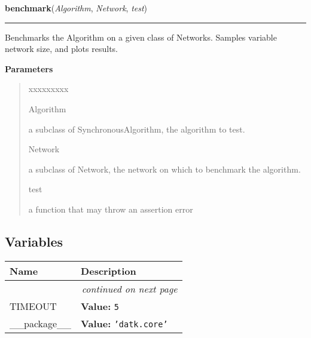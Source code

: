 \hspace{.8\funcindent}\begin{boxedminipage}{\funcwidth}

    \raggedright \textbf{benchmark}(\textit{Algorithm}, \textit{Network}, \textit{test})

    \vspace{-1.5ex}

    \rule{\textwidth}{0.5\fboxrule}
\setlength{\parskip}{2ex}
    Benchmarks the Algorithm on a given class of Networks. Samples variable
    network size, and plots results.

\setlength{\parskip}{1ex}
      \textbf{Parameters}
      \vspace{-1ex}

      \begin{quote}
        \begin{Ventry}{xxxxxxxxx}

          \item[Algorithm]

          a subclass of SynchronousAlgorithm, the algorithm to test.

          \item[Network]

          a subclass of Network, the network on which to benchmark the 
          algorithm.

          \item[test]

          a function that may throw an assertion error

        \end{Ventry}

      \end{quote}

    \end{boxedminipage}



  \subsection{Variables}

    \vspace{-1cm}
\hspace{\varindent}\begin{longtable}{|p{\varnamewidth}|p{\vardescrwidth}|l}
\cline{1-2}
\cline{1-2} \centering \textbf{Name} & \centering \textbf{Description}& \\
\cline{1-2}
\endhead\cline{1-2}\multicolumn{3}{r}{\small\textit{continued on next page}}\\\endfoot\cline{1-2}
\endlastfoot\raggedright T\-I\-M\-E\-O\-U\-T\- & \raggedright \textbf{Value:} 
{\tt 5}&\\
\cline{1-2}
\raggedright \_\-\_\-p\-a\-c\-k\-a\-g\-e\-\_\-\_\- & \raggedright \textbf{Value:} 
{\tt \texttt{'}\texttt{datk.core}\texttt{'}}&\\
\cline{1-2}
\end{longtable}

